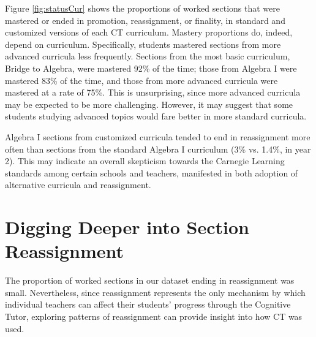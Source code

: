 \documentclass[12pt]{article}\usepackage[]{graphicx}\usepackage[]{color}
\begin{document}
Figure \ref{fig:statusCur} shows the proportions of worked sections
that were mastered or ended in promotion, reassignment, or finality, in
standard and customized versions of each CT curriculum.
Mastery proportions do, indeed, depend on curriculum.
Specifically, students mastered sections from more advanced curricula
less frequently.
Sections from the most basic curriculum, Bridge to Algebra, were
mastered
92\%
of the time;
those from Algebra I were mastered
83\%
of the time, and those from more advanced curricula were mastered
at a rate of
75\%.
This is unsurprising, since more advanced curricula may be expected
to be more challenging.
However, it may suggest that some students studying advanced topics
would fare better in more standard curricula.

Algebra I sections from customized curricula tended to end in
reassignment more often than sections from the standard Algebra I
curriculum (3\% vs.
1.4\%, in year 2).
This may indicate an overall skepticism towards the Carnegie Learning standards
among certain schools and teachers, manifested in both adoption of
alternative curricula and reassignment.%




\section{Digging Deeper into Section Reassignment}\label{sec:cp}
The proportion of worked sections in our dataset ending in
reassignment was small.
Nevertheless, since reassignment represents the only mechanism by
which individual teachers can affect their students' progress through
the Cognitive Tutor, exploring patterns of reassignment can provide
insight into how CT was used.
\end{document}
